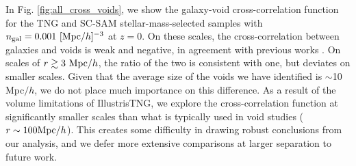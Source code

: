 \documentclass[fleqn,usenatbib]{mnras}
\newcommand{\rss}[1]{\textcolor{purple}{(rss: #1)}}
\begin{document}
In Fig. \ref{fig:all_cross_voids}, we show the galaxy-void cross-correlation function for the TNG and SC-SAM stellar-mass-selected samples with $n_{\rm gal} = 0.001 \ [{\rm Mpc}/h]^{-3}$ at $z = 0$. On these scales, the cross-correlation between galaxies and voids is weak and negative, in agreement with previous works \citep{2021MNRAS.501.1603H}. On scales of $r \gtrsim 3 \ {\rm Mpc}/h$, the ratio of the two is consistent with one, but deviates on smaller scales. Given that the average size of the voids we have identified is $\sim$10 Mpc$/h$, we do not place much importance on this difference. As a result of the volume limitations of IllustrisTNG, we explore the cross-correlation function at significantly smaller scales than what is typically used in void studies ($r \sim 100 {\rm Mpc}/h$). This creates some difficulty in drawing robust conclusions from our analysis, and we defer more extensive comparisons at larger separation to future work.
\end{document}
